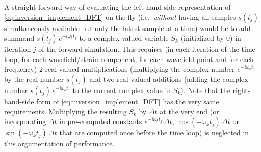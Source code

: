 \documentclass[12pt,a4paper]{article}
\begin{document}
A straight-forward way of evaluating the left-hand-side representation of \eqref{eq:inversion_implement_DFT} 
on the fly (i.e.\ \emph{without} 
having all samples $s(t_j)$ simultaneously available but only the latest sample at a time) would be to add summand
$s(t_j) \, e^{-i\omega_k t_j}$ to a complex-valued variable $S_k$ (initialized by $0$) in iteration $j$ of the
forward simulation. This requires (in each iteration of the time loop, for each wavefield/strain component, 
for each wavefield point and for each frequency) $2$ real-valued multiplications (multiplying the complex number 
$e^{-i\omega_k t_j}$ by the real number $s(t_j)$ and two real-valued additions (adding the complex number 
$s(t_j) \, e^{-i\omega_k t_j}$ to the current complex value in $S_k$). Note that the right-hand-side form of
\eqref{eq:inversion_implement_DFT} has the very same requirements.
Multiplying the resulting $S_k$ by $\Delta t$
at the very end (or incorporating $\Delta t$ in pre-computed constants $e^{-i\omega_k t_j}\,\Delta t$, 
$\cos(-\omega_k t_j)\,\Delta t$ or $\sin(-\omega_k t_j)\,\Delta t$ that are computed
once before the time loop) is neglected in this argumentation of performance.
\end{document}
